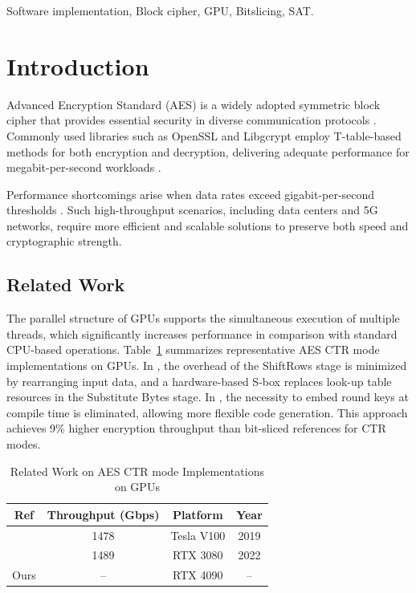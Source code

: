 \documentclass[journal]{IEEEtran}
\begin{document}
\begin{IEEEkeywords}
  Software implementation, Block cipher, GPU, Bitslicing, SAT.
\end{IEEEkeywords}

\section{Introduction}
\label{sec:intro}


 Advanced Encryption Standard (AES) is a widely adopted symmetric block cipher that provides essential security in diverse communication protocols \cite{Daemen2020}. Commonly used libraries such as OpenSSL and Libgcrypt employ T-table-based methods for both encryption and decryption, delivering adequate performance for megabit-per-second workloads \cite{Jancar2024, Marshall2021}.

Performance shortcomings arise when data rates exceed gigabit-per-second thresholds \cite{Li2020}. Such high-throughput scenarios, including data centers and 5G networks, require more efficient and scalable solutions to preserve both speed and cryptographic strength.

\subsection{Related Work}

The parallel structure of GPUs supports the simultaneous execution of multiple threads, which significantly increases performance in comparison with standard CPU-based operations. Table~\ref{tab:relared_work} summarizes representative AES CTR mode implementations on GPUs. In \cite{Hajihassani2019}, the overhead of the ShiftRows stage is minimized by rearranging input data, and a hardware-based S-box replaces look-up table resources in the Substitute Bytes stage. In \cite{Lee2022}, the necessity to embed round keys at compile time is eliminated, allowing more flexible code generation. This approach achieves 9\% higher encryption throughput than bit-sliced references for CTR modes.

\begin{table}
  \caption{Related Work on AES CTR mode Implementations on GPUs}
  \label{tab:relared_work}
  \centering
  \begin{tabular}{cccc}
    \toprule
    \textbf{Ref} & \textbf{Throughput (Gbps)} & \textbf{Platform} & \textbf{Year} \\
    \midrule
    \cite{Hajihassani2019} & 1478 & Tesla V100 & 2019 \\
    \cite{Lee2022}        & 1489 & RTX 3080   & 2022 \\
    Ours     & --   & RTX 4090         & --   \\
    \bottomrule
  \end{tabular}
\end{table}
\end{document}
